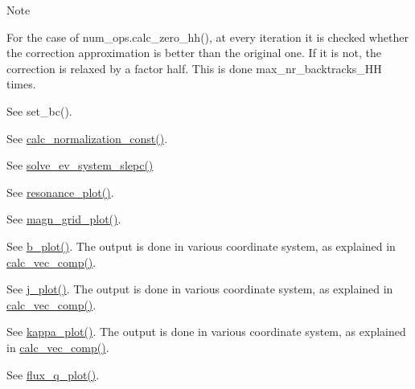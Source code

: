 \begin{DoxyNote}{Note}
\begin{DoxyEnumerate}
\item \label{page_inputs_fni9}%
%
For the case of num\+\_\+ops.\+calc\+\_\+zero\+\_\+hh(), at every iteration it is checked whether the correction approximation is better than the original one. If it is not, the correction is relaxed by a factor half. This is done {\ttfamily max\+\_\+nr\+\_\+backtracks\+\_\+\+HH} times.
\item \label{page_inputs_fni10}%
%
See set\+\_\+bc().
\item \label{page_inputs_fni11}%
%
See \hyperlink{namespaceeq__ops_a09b10d95cd83c89e817664a954f7555d}{calc\+\_\+normalization\+\_\+const()}.
\item \label{page_inputs_fni12}%
%
See \hyperlink{namespaceslepc__ops_ad9d4a9b7275ac5a6b9b35e481a7c1710}{solve\+\_\+ev\+\_\+system\+\_\+slepc()}
\item \label{page_inputs_fni13}%
%
See \hyperlink{namespacex__ops_a766228ae0a64f84c10521a013367cfc8}{resonance\+\_\+plot()}.
\item \label{page_inputs_fni14}%
%
See \hyperlink{namespacegrid__ops_addd76b7b3be0b51e0863ae0cdfef41e6}{magn\+\_\+grid\+\_\+plot()}.
\item \label{page_inputs_fni15}%
%
See \hyperlink{namespaceeq__ops_a9dab060a0bbbbaf6c8ccb66e1f5f160b}{b\+\_\+plot()}. The output is done in various coordinate system, as explained in \hyperlink{namespacegrid__utilities_a3076796477d38ffed189868b3b28efb1}{calc\+\_\+vec\+\_\+comp()}.
\item \label{page_inputs_fni16}%
%
See \hyperlink{namespaceeq__ops_af611fc0c83d1ab5ed8940d9a1a652d6c}{j\+\_\+plot()}. The output is done in various coordinate system, as explained in \hyperlink{namespacegrid__utilities_a3076796477d38ffed189868b3b28efb1}{calc\+\_\+vec\+\_\+comp()}.
\item \label{page_inputs_fni17}%
%
See \hyperlink{namespaceeq__ops_a9ecb744b3812fe838f13c9886307da24}{kappa\+\_\+plot()}. The output is done in various coordinate system, as explained in \hyperlink{namespacegrid__utilities_a3076796477d38ffed189868b3b28efb1}{calc\+\_\+vec\+\_\+comp()}.
\item \label{page_inputs_fni18}%
%
See \hyperlink{namespaceeq__ops_af0effe20188d46a44680c2648e4572e9}{flux\+\_\+q\+\_\+plot()}.

\end{DoxyEnumerate}
\end{DoxyNote}
